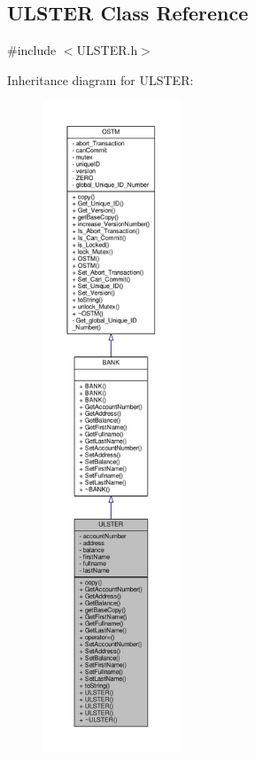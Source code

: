 \hypertarget{class_u_l_s_t_e_r}{}\subsection{U\+L\+S\+T\+ER Class Reference}
\label{class_u_l_s_t_e_r}


{\ttfamily \#include $<$U\+L\+S\+T\+E\+R.\+h$>$}



Inheritance diagram for U\+L\+S\+T\+ER\+:
\nopagebreak
\begin{figure}[H]
\begin{center}
\leavevmode
\includegraphics[height=550pt]{class_u_l_s_t_e_r__inherit__graph}
\end{center}
\end{figure}


